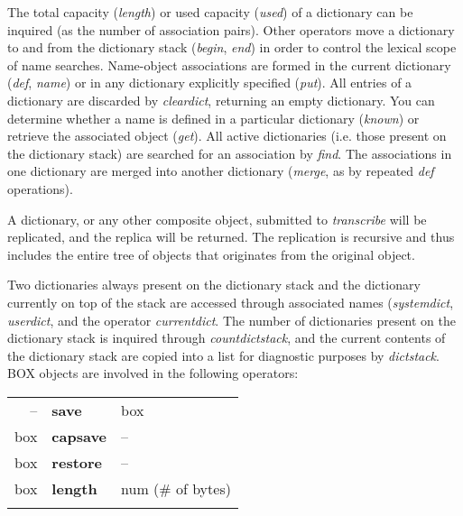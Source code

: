 The  total capacity (\emph{length}) or used capacity (\emph{used}) of a dictionary  can be inquired (as the number of association pairs). Other operators move  a dictionary  to  and from the dictionary stack (\emph{begin}, \emph{end})  in  order  to control  the lexical scope of name searches. Name-object associations are formed in the current dictionary (\emph{def},  \emph{name}) or  in  any  dictionary  explicitly  specified  (\emph{put}). All entries of a dictionary are discarded by \emph{cleardict}, returning an empty dictionary. You  can determine  whether a name is defined  in  a  particular dictionary (\emph{known}) or retrieve the associated object (\emph{get}). All active dictionaries (i.e. those present on the dictionary stack) are searched for an  association  by \emph{find}.  The associations in one dictionary are merged into another dictionary (\emph{merge}, as  by repeated \emph{def} operations). 

A dictionary, or any other composite object, submitted to \emph{transcribe} will be replicated, and the replica will be returned. The replication is recursive and thus includes the entire tree of objects that originates from the original object.

Two  dictionaries  always  present  on  the  dictionary  stack  and   the dictionary   currently   on  top  of  the  stack  are   accessed   through associated  names  (\emph{systemdict}, \emph{userdict}, and the operator \emph{currentdict}.  The  number  of dictionaries present on the dictionary stack is inquired through \emph{countdictstack},  and the  current contents of the dictionary stack are copied into a  list  for diagnostic purposes by \emph{dictstack}.\\

\noindent BOX  objects are involved in the following operators:\\

\begin{tabular}{>{\sffamily}r>{\sffamily\bfseries}l>{\sffamily}l}
-- & save & box\\
box       & capsave & --\\
box       & restore & --\\
box       & length  & num (\# of bytes)\\\\
\end{tabular}



